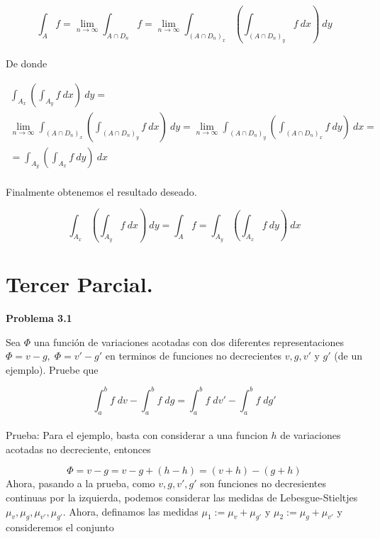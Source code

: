 \documentclass[12pt]{article}
\begin{document}
    \[\int_A f = \lim_{n\rightarrow \infty} \int_{A\cap D_n} f = \lim_{n\rightarrow \infty} \int_{(A\cap D_n)_x} \left(\int_{(A\cap D_n)_y} f \: dx\right) \: dy\]
    \\
    De donde 

    \begin{gather*}
        \int_{A_x}\left(\int_{A_y}f\:dx\right)\:dy = \\ 
        \lim_{n\rightarrow \infty} \int_{(A\cap D_n)_x} \left(\int_{(A\cap D_n)_y} f \: dx\right) \: dy = \lim_{n\rightarrow \infty} \int_{(A\cap D_n)_y} \left(\int_{(A\cap D_n)_x} f \: dy\right) \: dx =\\
        =\int_{A_y}\left(\int_{A_x}f\:dy\right)\:dx 
    \end{gather*}
    \\
    Finalmente obtenemos el resultado deseado.

    \[\int_{A_x}\left(\int_{A_y}f\:dx\right)\:dy = \int_A f = \int_{A_y}\left(\int_{A_x}f\:dy\right)\:dx\]
    \newpage

    \section{Tercer Parcial.}


    \textbf{Problema 3.1}

    Sea $\Phi$ una funci\'on de variaciones acotadas con dos diferentes representaciones
    $\Phi = v-g,\; \Phi = v'-g'$ en terminos de funciones no decrecientes $v,g,v'$ y 
    $g'$ (de un ejemplo). Pruebe que

    \[\int_a^b f\;dv - \int_a^b f\;dg = \int_a^b f\;dv' - \int_a^b f\;dg'\]
    \\

    Prueba: Para el ejemplo, basta con considerar a una funcion $h$ de variaciones acotadas
    no decreciente, entonces 

    \[\Phi = v-g = v-g+(h-h) = (v+h)-(g+h)\]
    Ahora, pasando a la prueba, como $v,g,v',g'$ son funciones no decresientes continuas
    por la izquierda, podemos considerar las medidas de Lebesgue-Stieltjes 
    $\mu_v,\mu_g,\mu_{v'},\mu_{g'}$. 
    Ahora, definamos las medidas 
    $\mu_1 := \mu_v+\mu_{g'}$ y $\mu_2 := \mu_g+\mu_{v'}$ y consideremos el conjunto 
    
\end{document}
